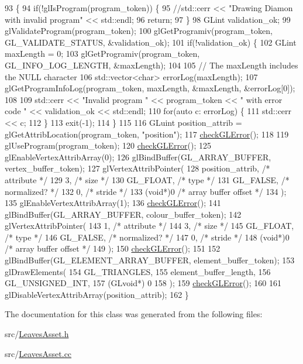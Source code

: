\begin{DoxyCode}
93                                            \{
94   \textcolor{keywordflow}{if}(!glIsProgram(program\_token)) \{
95     \textcolor{comment}{//std::cerr << "Drawing Diamon with invalid program" << std::endl;}
96     \textcolor{keywordflow}{return};
97   \}
98   GLint validation\_ok;
99   glValidateProgram(program\_token);
100   glGetProgramiv(program\_token, GL\_VALIDATE\_STATUS, &validation\_ok);
101   \textcolor{keywordflow}{if}(!validation\_ok) \{
102     GLint maxLength = 0;
103     glGetProgramiv(program\_token, GL\_INFO\_LOG\_LENGTH, &maxLength);
104 
105     \textcolor{comment}{// The maxLength includes the NULL character}
106     std::vector<char> errorLog(maxLength);
107     glGetProgramInfoLog(program\_token, maxLength, &maxLength, &errorLog[0]);
108 
109     std::cerr << \textcolor{stringliteral}{"Invalid program "} << program\_token << \textcolor{stringliteral}{" with error code "} << validation\_ok << std::endl;
110     \textcolor{keywordflow}{for}(\textcolor{keyword}{auto} c: errorLog) \{
111       std::cerr << c;
112     \}
113     exit(-1);
114   \}
115 
116   GLuint position\_attrib = glGetAttribLocation(program\_token, \textcolor{stringliteral}{"position"});
117   \hyperlink{_leaves_asset_8cc_a75f201b0e53e68726854997957322b8d}{checkGLError}();
118 
119   glUseProgram(program\_token);
120   \hyperlink{_leaves_asset_8cc_a75f201b0e53e68726854997957322b8d}{checkGLError}();
125   glEnableVertexAttribArray(0);
126   glBindBuffer(GL\_ARRAY\_BUFFER, vertex\_buffer\_token);
127   glVertexAttribPointer(
128     position\_attrib,        \textcolor{comment}{/* attribute */}
129     3,        \textcolor{comment}{/* size */}
130     GL\_FLOAT,   \textcolor{comment}{/* type */}
131     GL\_FALSE,   \textcolor{comment}{/* normalized? */}
132     0,        \textcolor{comment}{/* stride */}
133     (\textcolor{keywordtype}{void}*)0    \textcolor{comment}{/* array buffer offset */}
134   );
135   glEnableVertexAttribArray(1);
136   \hyperlink{_leaves_asset_8cc_a75f201b0e53e68726854997957322b8d}{checkGLError}();
141   glBindBuffer(GL\_ARRAY\_BUFFER, colour\_buffer\_token);
142   glVertexAttribPointer(
143     1,        \textcolor{comment}{/* attribute */}
144     3,        \textcolor{comment}{/* size */}
145     GL\_FLOAT,   \textcolor{comment}{/* type */}
146     GL\_FALSE,   \textcolor{comment}{/* normalized? */}
147     0,        \textcolor{comment}{/* stride */}
148     (\textcolor{keywordtype}{void}*)0    \textcolor{comment}{/* array buffer offset */}
149   );
150   \hyperlink{_leaves_asset_8cc_a75f201b0e53e68726854997957322b8d}{checkGLError}();
151 
152   glBindBuffer(GL\_ELEMENT\_ARRAY\_BUFFER, element\_buffer\_token);
153   glDrawElements(
154     GL\_TRIANGLES,
155     element\_buffer\_length,
156     GL\_UNSIGNED\_INT,
157     (GLvoid*) 0
158   );
159   \hyperlink{_leaves_asset_8cc_a75f201b0e53e68726854997957322b8d}{checkGLError}();
160 
161   glDisableVertexAttribArray(position\_attrib);
162 \}
\end{DoxyCode}


The documentation for this class was generated from the following files\+:\begin{DoxyCompactItemize}
\item 
src/\hyperlink{_leaves_asset_8h}{Leaves\+Asset.\+h}\item 
src/\hyperlink{_leaves_asset_8cc}{Leaves\+Asset.\+cc}\end{DoxyCompactItemize}
